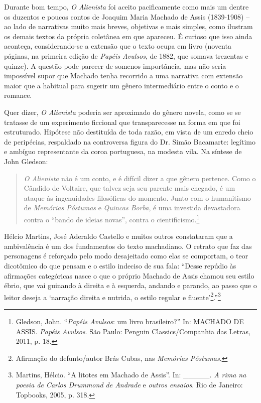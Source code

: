 Durante bom tempo, \emph{O Alienista} foi aceito pacificamente como mais
um dentre os duzentos e poucos contos de Joaquim Maria Machado de Assis
(1839-1908) -- ao lado de narrativas muito mais breves, objetivas e mais
simples, como ilustram os demais textos da própria coletânea em que
apareceu. É curioso que isso ainda aconteça, considerando-se a extensão
que o texto ocupa em livro (noventa páginas, na primeira edição de
\emph{Papéis Avulsos}, de 1882, que somava trezentas e quinze). A
questão pode parecer de somenos importância, mas não seria impossível
supor que Machado tenha recorrido a uma narrativa com extensão maior que
a habitual para sugerir um gênero intermediário entre o conto e o
romance.

Quer dizer, \emph{O Alienista} poderia ser aproximado do gênero novela,
como se se tratasse de um experimento ficcional que transparecesse na
forma em que foi estruturado. Hipótese não destituída de toda razão, em
vista de um enredo cheio de peripécias, respaldado na controversa figura
do Dr. Simão Bacamarte: legítimo e ambíguo representante da coroa
portuguesa, na modesta vila. Na síntese de John Gledson:

\begin{quote}
\emph{O Alienista} não é um conto, e é difícil dizer a que gênero
pertence. Como o Cândido de Voltaire, que talvez seja seu parente mais
chegado, é um ataque às ingenuidades filosóficas do momento. Junto com o
humanitismo de \emph{Memórias Póstumas} e \emph{Quincas Borba}, é uma
investida devastadora contra o ``bando de ideias novas'', contra o
cientificismo.\footnote{Gledson, John. ``\emph{Papéis Avulsos}: um livro
  brasileiro?'' In: MACHADO DE ASSIS. \emph{Papéis Avulsos}. São Paulo:
  Penguin Classics/Companhia das Letras, 2011, p. 18.}
\end{quote}

Hélcio Martins, José Aderaldo Castello e muitos outros constataram que a
ambivalência é um dos fundamentos do texto machadiano. O retrato que faz
das personagens é reforçado pelo modo desajeitado como elas se
comportam, o teor dicotômico do que pensam e o estilo indeciso de sua
fala: ``Desse repúdio às afirmações categóricas nasce o que o próprio
Machado de Assis chamou seu estilo ébrio, que vai guinando à direita e à
esquerda, andando e parando, ao passo que o leitor deseja a `narração
direita e nutrida, o estilo regular e fluente'\footnote{Afirmação do
  defunto/autor Brás Cubas, nas \emph{Memórias Póstumas}.}.''\footnote{Martins,
  Hélcio. ``A litotes em Machado de Assis''. In: \_\_\_\_\_. \emph{A
  rima na poesia de Carlos Drummond de Andrade} e \emph{outros ensaios}.
  Rio de Janeiro: Topbooks, 2005, p. 318.}

